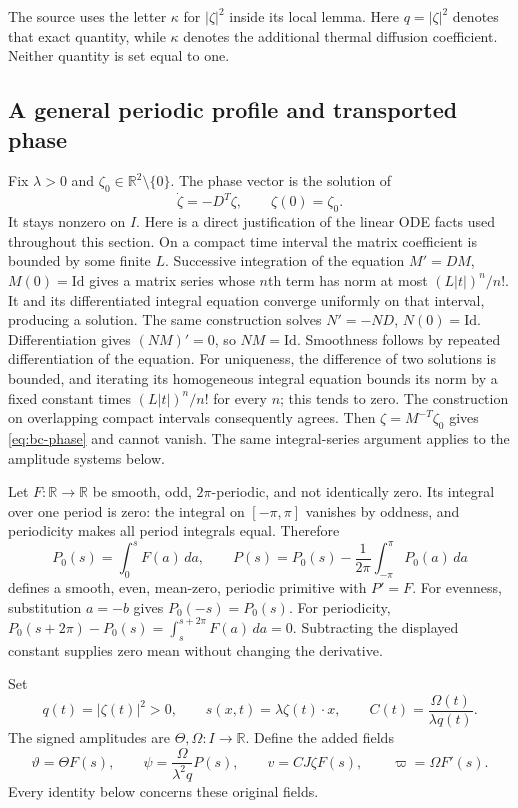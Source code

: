 The source uses the letter $\kappa$ for $|\zeta|^2$ inside its local lemma.
Here $q=|\zeta|^2$ denotes that exact quantity, while $\kappa$ denotes
the additional thermal diffusion coefficient. Neither quantity is set
equal to one.

\subsection{A general periodic profile and transported phase}

Fix $\lambda>0$ and $\zeta_0\in\mathbb R^2\setminus\{0\}$.
The phase vector is the solution of
\begin{equation}
\dot\zeta=-D^T\zeta,\qquad \zeta(0)=\zeta_0.
\label{eq:bc-phase}
\end{equation}
It stays nonzero on $I$. Here is a direct justification of the linear
ODE facts used throughout this section. On a compact time interval the
matrix coefficient is bounded by some finite $L$. Successive integration
of the equation $M'=DM$, $M(0)=\mathrm{Id}$ gives a matrix series whose
$n$th term has norm at most $(L|t|)^n/n!$. It and its differentiated
integral equation converge uniformly on that interval, producing a
solution. The same construction solves $N'=-ND$, $N(0)=\mathrm{Id}$.
Differentiation gives $(NM)'=0$, so $NM=\mathrm{Id}$. Smoothness follows
by repeated differentiation of the equation. For uniqueness, the
difference of two solutions is bounded, and iterating its homogeneous
integral equation bounds its norm by a fixed constant times
$(L|t|)^n/n!$ for every $n$; this tends to zero. The construction on
overlapping compact intervals consequently agrees. Then
$\zeta=M^{-T}\zeta_0$ gives \eqref{eq:bc-phase} and cannot vanish.
The same integral-series argument applies to the amplitude systems below.

Let $F:\mathbb R\to\mathbb R$ be smooth, odd, $2\pi$-periodic,
and not identically zero. Its integral over one period is zero:
the integral on $[-\pi,\pi]$ vanishes by oddness, and periodicity makes
all period integrals equal. Therefore
\[
P_0(s)=\int_0^sF(a)\,da,\qquad
P(s)=P_0(s)-\frac1{2\pi}\int_{-\pi}^{\pi}P_0(a)\,da
\]
defines a smooth, even, mean-zero, periodic primitive with $P'=F$.
For evenness, substitution $a=-b$ gives $P_0(-s)=P_0(s)$.
For periodicity,
$P_0(s+2\pi)-P_0(s)=\int_s^{s+2\pi}F(a)\,da=0$.
Subtracting the displayed constant supplies zero mean without changing
the derivative.

Set
\[
q(t)=|\zeta(t)|^2>0,\qquad
s(x,t)=\lambda\zeta(t)\cdot x,\qquad
C(t)=\frac{\Omega(t)}{\lambda q(t)}.
\]
The signed amplitudes are $\Theta,\Omega:I\to\mathbb R$.
Define the added fields
\begin{equation}
\vartheta=\Theta F(s),\qquad
\psi=\frac{\Omega}{\lambda^2q}P(s),\qquad
v=CJ\zeta F(s),\qquad
\varpi=\Omega F'(s).
\label{eq:bc-wave}
\end{equation}
Every identity below concerns these original fields.

